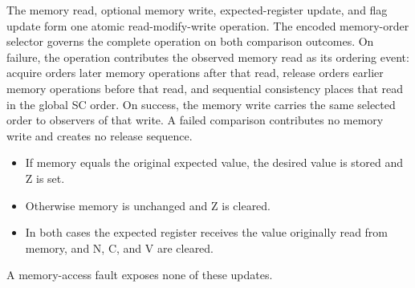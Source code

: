 The memory read, optional memory write, expected-register update, and flag update form one atomic read-modify-write operation.
The encoded memory-order selector governs the complete operation on both comparison outcomes. On failure, the
operation contributes the observed memory read as its ordering event: acquire orders later memory operations after
that read, release orders earlier memory operations before that read, and sequential consistency places that read in
the global SC order. On success, the memory write carries the same selected order to observers of that write. A
failed comparison contributes no memory write and creates no release sequence.

\begin{itemize}
\item If memory equals the original expected value, the desired value is stored and Z is set.
\item Otherwise memory is unchanged and Z is cleared.
\item In both cases the expected register receives the value originally read from memory, and N, C, and V are cleared.
\end{itemize}
A memory-access fault exposes none of these updates.
